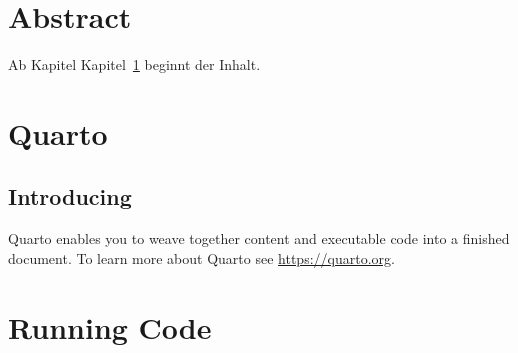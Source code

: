 \documentclass[
  11pt,
]{scrbook}
\renewcommand*\contentsname{Inhaltsverzeichnis}
\newcommand\contentsname{Inhaltsverzeichnis}
\begin{document}
\begin{frontmatter}
\begin{titlepage}
  	
  	 
  	
  	\vfill %
  \end{titlepage}
  \end{frontmatter}

  \ifdefined\Shaded\renewenvironment{Shaded}{\begin{tcolorbox}[frame hidden, boxrule=0pt, enhanced, sharp corners, borderline west={3pt}{0pt}{shadecolor}, breakable, interior hidden]}{\end{tcolorbox}}\fi

\renewcommand*\contentsname{Inhaltsverzeichnis}
{
\setcounter{tocdepth}{2}
\tableofcontents
}
\listoffigures
\listoftables
{}
\mainmatter
\hypertarget{abstract}{%
\chapter*{Abstract}\label{abstract}}

Ab Kapitel Kapitel~\ref{sec-quarto} beginnt der Inhalt.

\hypertarget{sec-quarto}{%
\chapter{Quarto}\label{sec-quarto}}

\hypertarget{introducing}{%
\section{Introducing}\label{introducing}}

Quarto enables you to weave together content and executable code into a
finished document. To learn more about Quarto see
\url{https://quarto.org}.

\hypertarget{running-code}{%
\chapter{Running Code}\label{running-code}}
\end{document}
